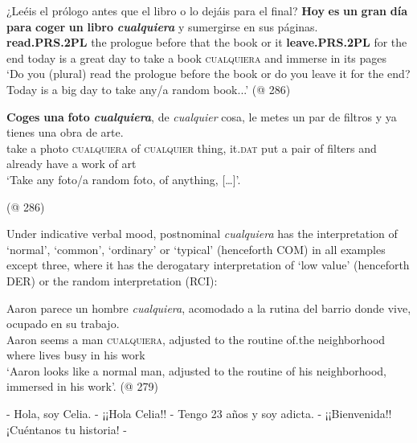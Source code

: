      \gll ¿Leéis el prólogo antes que el libro o lo dejáis para el final? \textbf{Hoy} \textbf{es} \textbf{un} \textbf{gran} \textbf{día} \textbf{para} \textbf{coger} \textbf{un} \textbf{libro} \textit{\textbf{cualquiera}} y sumergirse en sus páginas.\\
     \textbf{read.PRS.2PL} the prologue before that the book or it \textbf{leave.PRS.2PL} for the end today is a great day to take a book \textsc{cualquiera} and immerse in its pages\\
    \glt ‘Do you (plural) read the prologue before the book or do you leave it for the end? Today is a big day to take any/a random book...' (@ 286)  
\z

\ea \label{ex:key:Coges} %
    \gll \textbf{Coges} \textbf{una} \textbf{foto} \textit{\textbf{cualquiera}}, de \textit{cualquier} cosa, le metes un par de filtros y ya tienes una obra de arte.\\
    take a photo \textsc{cualquiera} of \textsc{cualquier} thing, it.\textsc{dat} put a pair of filters and already have a work of art\\
    \glt ‘Take any foto/a random foto, of anything, […]’.
    
    (@ 286) 
\z

{Under indicative verbal mood, postnominal \textit{cualquiera} has the interpretation of ‘normal’, ‘common’, ‘ordinary’ or ‘typical’ (henceforth COM) in all examples except three, where it has the derogatary interpretation of ‘low value’ (henceforth DER) or the random interpretation (RCI):} 

\ea \label{ex:key:Aaron} %
  \gll Aaron parece un hombre \textit{cualquiera}, acomodado a la rutina del barrio donde vive, ocupado en su trabajo.\\
    Aaron seems a man \textsc{cualquiera}, adjusted to the routine of.the neighborhood where lives busy in his work\\
    \glt ‘Aaron looks like a normal man, adjusted to the routine of his neighborhood, immersed in his work’. (@ 279) 
\z

\ea \label{ex:key:Hola} %
      - Hola, soy Celia. - ¡¡Hola Celia!! - Tengo 23 años y soy adicta. - ¡¡Bienvenida!! ¡Cuéntanos tu historia! - 
     
